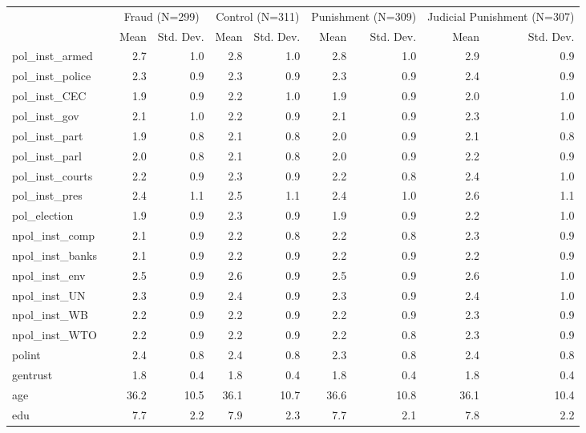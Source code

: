 \begin{table}
\centering
\begin{tabular}[t]{llrrrrrrrr}
\toprule
\multicolumn{2}{c}{ } & \multicolumn{2}{c}{Fraud (N=299)} & \multicolumn{2}{c}{Control (N=311)} & \multicolumn{2}{c}{Punishment (N=309)} & \multicolumn{2}{c}{Judicial Punishment (N=307)} \\
\cmidrule(l{3pt}r{3pt}){3-4} \cmidrule(l{3pt}r{3pt}){5-6} \cmidrule(l{3pt}r{3pt}){7-8} \cmidrule(l{3pt}r{3pt}){9-10}
  &    & Mean & Std. Dev. & Mean & Std. Dev. & Mean & Std. Dev. & Mean & Std. Dev.\\
\midrule
pol\_inst\_armed &  & 2.7 & 1.0 & 2.8 & 1.0 & 2.8 & 1.0 & 2.9 & 0.9\\
pol\_inst\_police &  & 2.3 & 0.9 & 2.3 & 0.9 & 2.3 & 0.9 & 2.4 & 0.9\\
pol\_inst\_CEC &  & 1.9 & 0.9 & 2.2 & 1.0 & 1.9 & 0.9 & 2.0 & 1.0\\
pol\_inst\_gov &  & 2.1 & 1.0 & 2.2 & 0.9 & 2.1 & 0.9 & 2.3 & 1.0\\
pol\_inst\_part &  & 1.9 & 0.8 & 2.1 & 0.8 & 2.0 & 0.9 & 2.1 & 0.8\\
pol\_inst\_parl &  & 2.0 & 0.8 & 2.1 & 0.8 & 2.0 & 0.9 & 2.2 & 0.9\\
pol\_inst\_courts &  & 2.2 & 0.9 & 2.3 & 0.9 & 2.2 & 0.8 & 2.4 & 1.0\\
pol\_inst\_pres &  & 2.4 & 1.1 & 2.5 & 1.1 & 2.4 & 1.0 & 2.6 & 1.1\\
pol\_election &  & 1.9 & 0.9 & 2.3 & 0.9 & 1.9 & 0.9 & 2.2 & 1.0\\
npol\_inst\_comp &  & 2.1 & 0.9 & 2.2 & 0.8 & 2.2 & 0.8 & 2.3 & 0.9\\
npol\_inst\_banks &  & 2.1 & 0.9 & 2.2 & 0.9 & 2.2 & 0.9 & 2.2 & 0.9\\
npol\_inst\_env &  & 2.5 & 0.9 & 2.6 & 0.9 & 2.5 & 0.9 & 2.6 & 1.0\\
npol\_inst\_UN &  & 2.3 & 0.9 & 2.4 & 0.9 & 2.3 & 0.9 & 2.4 & 1.0\\
npol\_inst\_WB &  & 2.2 & 0.9 & 2.2 & 0.9 & 2.2 & 0.9 & 2.3 & 0.9\\
npol\_inst\_WTO &  & 2.2 & 0.9 & 2.2 & 0.9 & 2.2 & 0.8 & 2.3 & 0.9\\
polint &  & 2.4 & 0.8 & 2.4 & 0.8 & 2.3 & 0.8 & 2.4 & 0.8\\
gentrust &  & 1.8 & 0.4 & 1.8 & 0.4 & 1.8 & 0.4 & 1.8 & 0.4\\
age &  & 36.2 & 10.5 & 36.1 & 10.7 & 36.6 & 10.8 & 36.1 & 10.4\\
edu &  & 7.7 & 2.2 & 7.9 & 2.3 & 7.7 & 2.1 & 7.8 & 2.2\\

\end{tabular}
\end{table}

